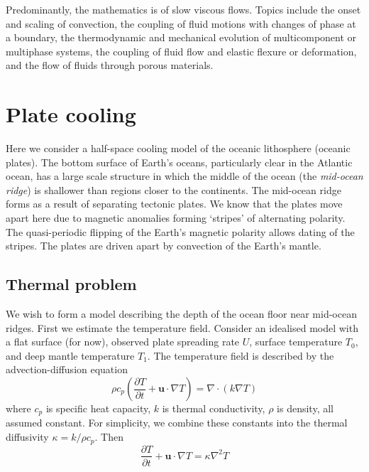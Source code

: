 \documentclass{jknotes}
\begin{document}
Predominantly, the mathematics is of slow viscous flows. Topics include the
onset and scaling of convection, the coupling of fluid motions with changes of
phase at a boundary, the thermodynamic and mechanical evolution of
multicomponent or multiphase systems, the coupling of fluid flow and elastic
flexure or deformation, and the flow of fluids through porous materials. 

\section{Plate cooling}
Here we consider a half-space cooling model of the oceanic lithosphere
(oceanic plates). The bottom surface of Earth's oceans, particularly clear in
the Atlantic ocean, has a large scale structure in which the middle of the
ocean (the \emph{mid-ocean ridge}) is shallower than regions closer to the
continents.  The mid-ocean ridge forms as a result of separating tectonic
plates. We know that the plates move apart here due to magnetic anomalies
forming `stripes' of alternating polarity. The quasi-periodic flipping of the
Earth's magnetic polarity allows dating of the stripes. The plates are driven
apart by convection of the Earth's mantle.

\subsection{Thermal  problem}
We wish to form a model describing the depth of the ocean floor near mid-ocean
ridges. First we estimate the temperature field. Consider an idealised model
with a flat surface (for now), observed plate spreading rate $U$, surface
temperature $T_0$, and deep mantle temperature $T_1$.
The temperature field is described by the advection-diffusion equation
\begin{equation}
	\rho c_p \left(\frac{\partial T}{\partial t} + \symbf{u}\cdot\nabla T
	\right) = \nabla \cdot (k \nabla T)
\end{equation}
where $c_p$ is specific heat capacity, $k$ is thermal conductivity, $\rho$ is
density, all assumed constant. For simplicity, we combine these constants into
the thermal diffusivity $\kappa = k/\rho c_p$. Then
\begin{equation}
	\frac{\partial T}{\partial t} + \symbf{u}\cdot\nabla T
	 = \kappa \nabla^2 T
\end{equation}
\end{document}
